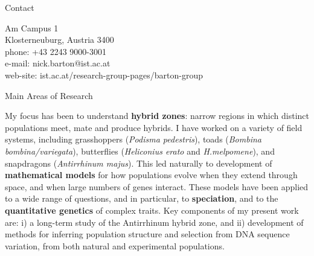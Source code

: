 \documentclass[10pt]{article}
\date{}
\begin{document}


\newlength{\oldcvlabelwidth}
\renewcommand*{\cvbibname}{}




\begin{cv}



\begin{cvlist}{Contact}
    \item Am Campus 1\\
     Klosterneuburg, Austria 3400\\
      phone: +43 2243 9000-3001\\
      e-mail: nick.barton@ist.ac.at\\%
      web-site: ist.ac.at/research-group-pages/barton-group
\end{cvlist}

\begin{cvlist}{Main Areas of Research}
\item My focus has been to understand \textbf{hybrid zones}: narrow regions in which distinct populations meet, mate and produce hybrids.  I have worked on a variety of field systems, including grasshoppers (\textit{Podisma pedestris}), toads (\textit{Bombina bombina/variegata}), butterflies (\textit{Heliconius erato} and \textit{H.melpomene}), and snapdragons (\textit{Antirrhinum majus}).  This led naturally to development of \textbf{mathematical models} for how populations evolve when they extend through space, and when large numbers of genes interact.  These models have been applied to a wide range of questions, and in particular, to \textbf{speciation}, and to the  \textbf{quantitative genetics} of complex traits.  Key components of my present work are: i) a long-term study of the Antirrhinum hybrid zone, and ii) development of methods for inferring population structure and selection from DNA sequence variation, from both natural and experimental populations.
\end{cvlist}


\end{cv}
\end{document}
